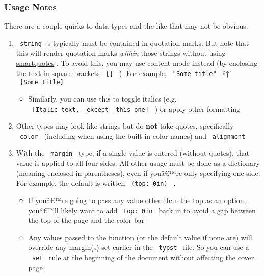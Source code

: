 \subsubsection{Usage Notes}\label{usage-notes}

There are a couple quirks to data types and the like that may not be
obvious.

\begin{enumerate}
\tightlist
\item
  \texttt{\ string\ } s typically must be contained in quotation marks.
  But note that this will render quotation marks \emph{within} those
  strings without using
  \href{https://typst.app/docs/reference/text/smartquote/}{smartquotes}
  . To avoid this, you may use content mode instead (by enclosing the
  text in square brackets \texttt{\ {[}{]}\ } ). For example,
  \texttt{\ "Some\ title"\ } â†' \texttt{\ {[}Some\ title{]}\ }

  \begin{itemize}
  \tightlist
  \item
    Similarly, you can use this to toggle italics (e.g.
    \texttt{\ {[}Italic\ text,\ \_except\_\ this\ one{]}\ } ) or apply
    other formatting
  \end{itemize}
\item
  Other types may look like strings but do \textbf{not} take quotes,
  specifically \texttt{\ color\ } (including when using the built-in
  color names) and \texttt{\ alignment\ }
\item
  With the \texttt{\ margin\ } type, if a single value is entered
  (without quotes), that value is applied to all four sides. All other
  usage must be done as a dictionary (meaning enclosed in parentheses),
  even if youâ€™re only specifying one side. For example, the default is
  written \texttt{\ (top:\ 0in)\ } .

  \begin{itemize}
  \tightlist
  \item
    If youâ€™re going to pass any value other than the top as an option,
    youâ€™ll likely want to add \texttt{\ top:\ 0in\ } back in to avoid
    a gap between the top of the page and the color bar
  \item
    Any values passed to the function (or the default value if none are)
    will override any margin(s) set earlier in the \texttt{\ typst\ }
    file. So you can use a \texttt{\ set\ } rule at the beginning of the
    document without affecting the cover page
  \end{itemize}
\end{enumerate}

